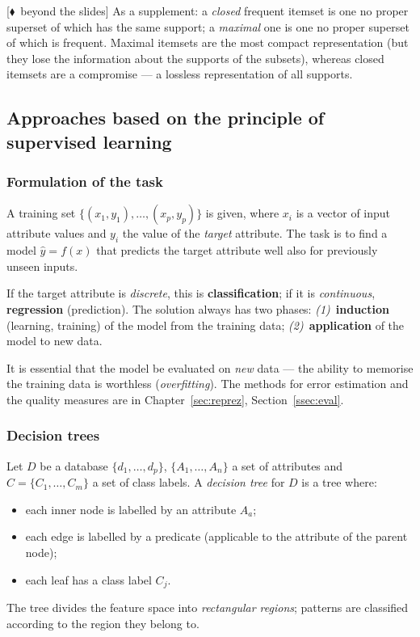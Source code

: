 \documentclass[11pt,a4paper]{article}
\theoremstyle{definition}
\newcommand{\mimo}{\textcolor{markcol}{\textsf{\footnotesize[$\blacklozenge$~beyond the slides]}}}
\begin{document}
\mimo{} As a supplement: a \emph{closed} frequent itemset is one no proper superset of which has
the same support; a \emph{maximal} one is one no proper superset of which is frequent. Maximal
itemsets are the most compact representation (but they lose the information about the supports of
the subsets), whereas closed itemsets are a compromise --- a lossless representation of all
supports.

\subsection{Approaches based on the principle of supervised learning}
\label{ssec:supervised}

\subsubsection{Formulation of the task}

\begin{defbox}
A training set $\{(x_1,y_1),\dots,(x_p,y_p)\}$ is given, where $x_i$ is a vector of input
attribute values and $y_i$ the value of the \emph{target} attribute. The task is to find a model
$\hat y=f(x)$ that predicts the target attribute well also for previously unseen inputs.

If the target attribute is \emph{discrete}, this is \textbf{classification}; if it is
\emph{continuous}, \textbf{regression} (prediction). The solution always has two phases:
\emph{(1)}~\textbf{induction} (learning, training) of the model from the training data;
\emph{(2)}~\textbf{application} of the model to new data.
\end{defbox}

It is essential that the model be evaluated on \emph{new} data --- the ability to memorise the
training data is worthless (\emph{overfitting}). The methods for error estimation and the quality
measures are in Chapter~\ref{sec:reprez}, Section~\ref{ssec:eval}.

\subsubsection{Decision trees}

\begin{defbox}
Let $D$ be a database $\{d_1,\dots,d_p\}$, $\{A_1,\dots,A_n\}$ a set of attributes and
$C=\{C_1,\dots,C_m\}$ a set of class labels. A \emph{decision tree} for $D$ is a tree where:
\begin{itemize}
\item each inner node is labelled by an attribute $A_a$;
\item each edge is labelled by a predicate (applicable to the attribute of the parent node);
\item each leaf has a class label $C_j$.
\end{itemize}
The tree divides the feature space into \emph{rectangular regions}; patterns are classified
according to the region they belong to.
\end{defbox}
\end{document}
